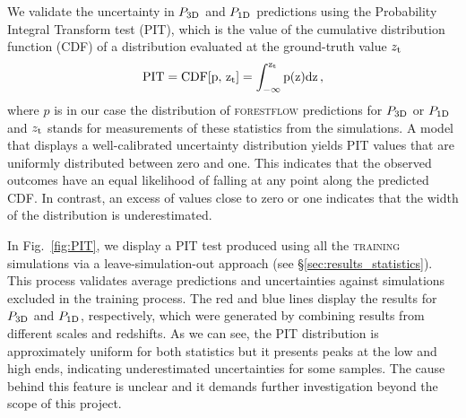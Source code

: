 \documentclass{aa}
\newcommand{\poned}{\ensuremath{P_{\rm 1D}}\xspace}
\newcommand{\pthreed}{\ensuremath{P_{\rm 3D}}\xspace}
\newcommand{\forestflow}{\textsc{forestflow}\xspace}
\newcommand{\lacehc}{\textsc{training}\xspace}
\begin{document}
\begin{appendix}
We validate the uncertainty in \pthreed and \poned predictions using the Probability Integral Transform test (PIT), which is the value of the cumulative distribution function (CDF) of a distribution evaluated at the ground-truth value $z_{\rm t}$
%
\begin{equation}
    \rm{PIT} = \mathrm{CDF}[p,\,z_{\rm t}]=\int_{-\infty}^{z_{\rm t}} p(z) \mathrm{d}z\, ,
    \label{eq:pit} 
\end{equation} 
%
where $p$ is in our case the distribution of \forestflow predictions for \pthreed or \poned and $z_{\rm t}$ stands for measurements of these statistics from the simulations. A model that displays a well-calibrated uncertainty distribution yields PIT values that are uniformly distributed between zero and one. This indicates that the observed outcomes have an equal likelihood of falling at any point along the predicted CDF. In contrast, an excess of values close to zero or one indicates that the width of the distribution is underestimated.

In Fig.~\ref{fig:PIT}, we display a PIT test produced using all the \lacehc simulations via a leave-simulation-out approach (see \S\ref{sec:results_statistics}). This process validates average predictions and uncertainties against simulations excluded in the training process. The red and blue lines display the results for \pthreed and \poned, respectively, which were generated by combining results from different scales and redshifts. As we can see, the PIT distribution is approximately uniform for both statistics but it presents peaks at the low and high ends, indicating underestimated uncertainties for some samples. The cause behind this feature is unclear and it demands further investigation beyond the scope of this project.

\end{appendix}
\end{document}
